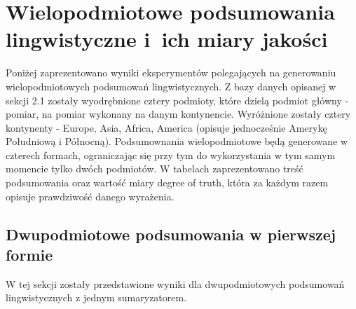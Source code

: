 \documentclass{article}
\begin{document}
\section{Wielopodmiotowe podsumowania lingwistyczne i~ich miary jakości} 
Poniżej zaprezentowano wyniki eksperymentów polegających na generowaniu wielopodmiotowych podsumowań lingwistycznych. Z bazy danych opisanej w sekcji 2.1 zostały wyodrębnione cztery podmioty, które dzielą podmiot główny - pomiar, na pomiar wykonany na danym kontynencie. Wyróżnione zostały cztery kontynenty - Europe, Asia, Africa, America (opisuje jednocześnie Amerykę Południową i Północną). Podsumownania wielopodmiotowe będą generowane w czterech formach, ograniczając się przy tym do wykorzystania w tym samym momencie tylko dwóch podmiotów. W tabelach zaprezentowano treść podsumowania oraz wartość miary degree of truth, która za każdym razem opisuje prawdziwość danego wyrażenia.

\subsection{Dwupodmiotowe podsumowania w pierwszej formie}
W tej sekcji zostały przedstawione wyniki dla dwupodmiotowych podsumowań lingwistycznych z jednym sumaryzatorem.
\end{document}
